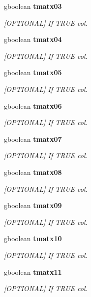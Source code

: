 \begin{CompactItemize}
gboolean {\bf tmatx03}
\begin{CompactList}\small\item\em [OPTIONAL] If TRUE col. \item\end{CompactList}\item 
gboolean {\bf tmatx04}
\begin{CompactList}\small\item\em [OPTIONAL] If TRUE col. \item\end{CompactList}\item 
gboolean {\bf tmatx05}
\begin{CompactList}\small\item\em [OPTIONAL] If TRUE col. \item\end{CompactList}\item 
gboolean {\bf tmatx06}
\begin{CompactList}\small\item\em [OPTIONAL] If TRUE col. \item\end{CompactList}\item 
gboolean {\bf tmatx07}
\begin{CompactList}\small\item\em [OPTIONAL] If TRUE col. \item\end{CompactList}\item 
gboolean {\bf tmatx08}
\begin{CompactList}\small\item\em [OPTIONAL] If TRUE col. \item\end{CompactList}\item 
gboolean {\bf tmatx09}
\begin{CompactList}\small\item\em [OPTIONAL] If TRUE col. \item\end{CompactList}\item 
gboolean {\bf tmatx10}
\begin{CompactList}\small\item\em [OPTIONAL] If TRUE col. \item\end{CompactList}\item 
gboolean {\bf tmatx11}
\begin{CompactList}\small\item\em [OPTIONAL] If TRUE col. \item\end{CompactList}\item 

\end{CompactItemize}
